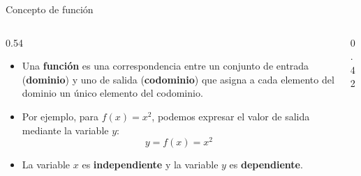 \documentclass[main.tex]{subfiles}
\begin{document}
\begin{frame}{Concepto de función}
  \begin{columns}[c,onlytextwidth]
    \begin{column}{0.54\textwidth}
      \begin{itemize}
        \item Una \textbf{función} es una correspondencia entre un conjunto de
              entrada (\textbf{dominio}) y uno de salida (\textbf{codominio})
              que asigna a cada elemento del dominio un único elemento del
              codominio.

        \item Por ejemplo, para $f(x)=x^2$, podemos expresar
              el valor de salida mediante la variable $y$:
              \[
                y=f(x)=x^2
              \]

        \item La variable $x$ es \textbf{independiente} y la variable $y$
              es \textbf{dependiente}.
      \end{itemize}
    \end{column}
    \begin{column}{0.42\textwidth}
      \centering
    \end{column}
  \end{columns}
\end{frame}
\end{document}

